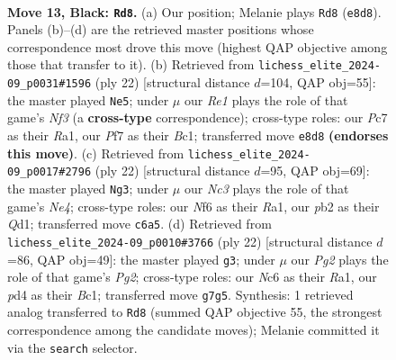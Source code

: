 \documentclass[11pt]{article}
\begin{document}
\begin{figure}[p]
\label{fig:thought-m23}
\end{figure}

\clearpage

\begin{figure}[p]\centering
\begin{subfigure}{0.46\textwidth}\centering
\resizebox{\linewidth}{!}{%
\newchessgame
\chessboard[
  setfen={1rb1r1k1/p1p1qppp/2n1pn2/2Pp4/1p1P4/1Q2PNP1/PP1B1P1P/R3KB1R b Q - 1 13},
  showmover=false,
  pgfstyle=straightmove, color=movearrow, markmove={e8-d8}
]}
\caption{}
\end{subfigure}\hfill
\begin{subfigure}{0.46\textwidth}\centering
\resizebox{\linewidth}{!}{%
\newchessgame
\chessboard[
  setfen={r1bqk2r/4ppbp/p4np1/1p1P4/2pP1P2/2N2N2/PPP1Q1PP/R1B2RK1 w kq - 0 12},
  showmover=false,
  pgfstyle=straightmove, color=movearrow, markmove={f3-e5}
]}
\caption{}
\end{subfigure}
\\[4pt]
\begin{subfigure}{0.46\textwidth}\centering
\resizebox{\linewidth}{!}{%
\newchessgame
\chessboard[
  setfen={r1b2rk1/pp2ppnp/2n3p1/q1p3P1/3pN2P/PP2PN2/2PP1P2/R2QKB1R w KQ - 1 12},
  showmover=false,
  pgfstyle=straightmove, color=movearrow, markmove={e4-g3}
]}
\caption{}
\end{subfigure}\hfill
\begin{subfigure}{0.46\textwidth}\centering
\resizebox{\linewidth}{!}{%
\newchessgame
\chessboard[
  setfen={rn2k2r/pp2bpp1/q1p1p3/3pPn1p/3P3P/1N3N2/PPP2PP1/R1BQ1RK1 w kq - 8 12},
  showmover=false,
  pgfstyle=straightmove, color=movearrow, markmove={g2-g3}
]}
\caption{}
\end{subfigure}
\caption{\textbf{Move 13, Black: \texttt{Rd8}.} (a) Our position; Melanie plays \texttt{Rd8} (\texttt{e8d8}). Panels (b)--(d) are the retrieved master positions whose correspondence most drove this move (highest QAP objective among those that transfer to it). (b) Retrieved from \texttt{lichess\_elite\_2024-09\_p0031\#1596} (ply 22) [structural distance $d$=104, QAP obj=55]: the master played \texttt{Ne5}; under $\mu$ our \emph{Re1} plays the role of that game's \emph{Nf3} (a \textbf{cross-type} correspondence); cross-type roles: our \emph{P}c7 as their \emph{R}a1, our \emph{P}f7 as their \emph{B}c1; transferred move \texttt{e8d8} \textbf{(endorses this move)}. (c) Retrieved from \texttt{lichess\_elite\_2024-09\_p0017\#2796} (ply 22) [structural distance $d$=95, QAP obj=69]: the master played \texttt{Ng3}; under $\mu$ our \emph{Nc3} plays the role of that game's \emph{Ne4}; cross-type roles: our \emph{N}f6 as their \emph{R}a1, our \emph{p}b2 as their \emph{Q}d1; transferred move \texttt{c6a5}. (d) Retrieved from \texttt{lichess\_elite\_2024-09\_p0010\#3766} (ply 22) [structural distance $d$=86, QAP obj=49]: the master played \texttt{g3}; under $\mu$ our \emph{Pg2} plays the role of that game's \emph{Pg2}; cross-type roles: our \emph{N}c6 as their \emph{R}a1, our \emph{p}d4 as their \emph{B}c1; transferred move \texttt{g7g5}. Synthesis: 1 retrieved analog transferred to \texttt{Rd8} (summed QAP objective 55, the strongest correspondence among the candidate moves); Melanie committed it via the \texttt{search} selector.}

\end{figure}
\end{document}
